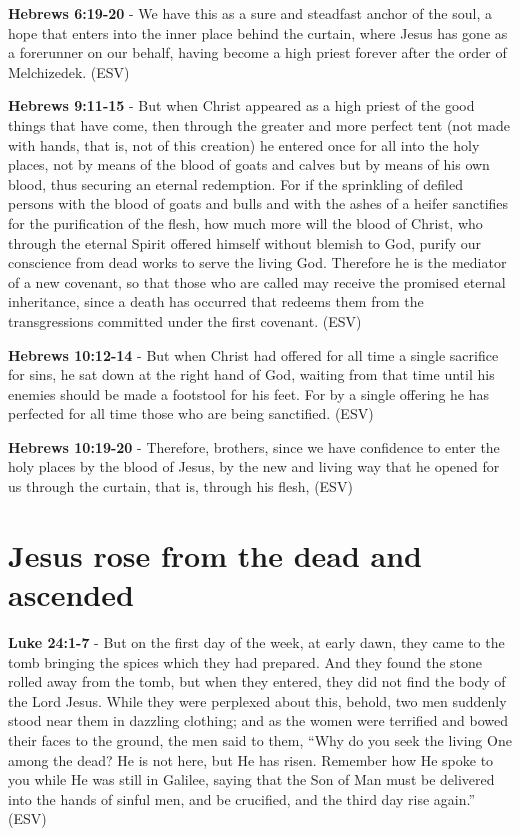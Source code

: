 \documentclass[11pt]{article}
\begin{document}
\textbf{Hebrews 6:19-20} - We have this as a sure and steadfast anchor of the soul, a hope that enters into the inner place behind the curtain, where Jesus has gone as a forerunner on our behalf, having become a high priest forever after the order of Melchizedek. (ESV)

\textbf{Hebrews 9:11-15} - But when Christ appeared as a high priest of the good things that have come, then through the greater and more perfect tent (not made with hands, that is, not of this creation) he entered once for all into the holy places, not by means of the blood of goats and calves but by means of his own blood, thus securing an eternal redemption. For if the sprinkling of defiled persons with the blood of goats and bulls and with the ashes of a heifer sanctifies for the purification of the flesh, how much more will the blood of Christ, who through the eternal Spirit offered himself without blemish to God, purify our conscience from dead works to serve the living God. Therefore he is the mediator of a new covenant, so that those who are called may receive the promised eternal inheritance, since a death has occurred that redeems them from the transgressions committed under the first covenant. (ESV)

\textbf{Hebrews 10:12-14} - But when Christ had offered for all time a single sacrifice for sins, he sat down at the right hand of God, waiting from that time until his enemies should be made a footstool for his feet. For by a single offering he has perfected for all time those who are being sanctified. (ESV)

\textbf{Hebrews 10:19-20} - Therefore, brothers, since we have confidence to enter the holy places by the blood of Jesus, by the new and living way that he opened for us through the curtain, that is, through his flesh, (ESV)

\section{Jesus rose from the dead and ascended}
\label{sec:org4af3852}
\textbf{Luke 24:1-7} - But on the first day of the week, at early dawn, they came to the tomb bringing the spices which they had prepared. And they found the stone rolled away from the tomb, but when they entered, they did not find the body of the Lord Jesus. While they were perplexed about this, behold, two men suddenly stood near them in dazzling clothing; and as the women were terrified and bowed their faces to the ground, the men said to them, “Why do you seek the living One among the dead? He is not here, but He has risen. Remember how He spoke to you while He was still in Galilee, saying that the Son of Man must be delivered into the hands of sinful men, and be crucified, and the third day rise again.” (ESV)
\end{document}
